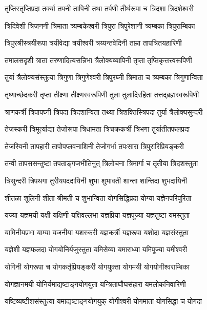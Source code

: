 \twolineshloka
{तृप्तिस्तृप्तिप्रदा तर्क्या तपनी तापिनी तथा}
{तर्पणी तीर्थरूपा च त्रिदशा त्रिदशेश्वरी}%

\twolineshloka
{त्रिदिवेशी त्रिजननी त्रिमाता त्र्यम्बकेश्वरी}
{त्रिपुरा त्रिपुरेशानी त्र्यम्बका त्रिपुराम्बिका}%

\twolineshloka
{त्रिपुरश्रीस्त्रयीरूपा त्रयीवेद्या त्रयीश्वरी}
{त्रय्यन्तवेदिनी ताम्रा तापत्रितयहारिणी}%

\twolineshloka
{तमालसदृशी त्राता तरुणादित्यसन्निभा}
{त्रैलोक्यव्यापिनी तृप्ता तृप्तिकृत्तत्त्वरूपिणी}%

\twolineshloka
{तुर्या त्रैलोक्यसंस्तुत्या त्रिगुणा त्रिगुणेश्वरी}
{त्रिपुरघ्नी त्रिमाता च त्र्यम्बका त्रिगुणान्विता}%

\twolineshloka
{तृष्णाच्छेदकरी तृप्ता तीक्ष्णा तीक्ष्णस्वरूपिणी}
{तुला तुलादिरहिता तत्तद्ब्रह्मस्वरूपिणी}%

\twolineshloka
{त्राणकर्त्री त्रिपापघ्नी त्रिपदा त्रिदशान्विता}
{तथ्या त्रिशक्तिस्त्रिपदा तुर्या त्रैलोक्यसुन्दरी}%

\twolineshloka
{तेजस्करी त्रिमूर्त्याद्या तेजोरूपा त्रिधामता}
{त्रिचक्रकर्त्री त्रिभगा तुर्यातीतफलप्रदा}%

\twolineshloka
{तेजस्विनी तापहारी तापोपप्लवनाशिनी}
{तेजोगर्भा तपःसारा त्रिपुरारिप्रियङ्करी}%

\twolineshloka
{तन्वी तापससन्तुष्टा तपताङ्गजभीतिनुत्}
{त्रिलोचना त्रिमार्गा च तृतीया त्रिदशस्तुता}%

\twolineshloka
{त्रिसुन्दरी त्रिपथगा तुरीयपददायिनी}
{शुभा शुभावती शान्ता शान्तिदा शुभदायिनी}%

\twolineshloka
{शीतळा शूलिनी शीता श्रीमती च शुभान्विता}
{योगसिद्धिप्रदा योग्या यज्ञेनपरिपूरिता}%

\twolineshloka
{यज्या यज्ञमयी यक्षी यक्षिणी यक्षिवल्लभा}
{यज्ञप्रिया यज्ञपूज्या यज्ञतुष्टा यमस्तुता}%

\twolineshloka
{यामिनीयप्रभा याम्या यजनीया यशस्करी}
{यज्ञकर्त्री यज्ञरूपा यशोदा यज्ञसंस्तुता}%

\twolineshloka
{यज्ञेशी यज्ञफलदा योगयोनिर्यजुस्तुता}
{यमिसेव्या यमाराध्या यमिपूज्या यमीश्वरी}%

\twolineshloka
{योगिनी योगरूपा च योगकर्तृप्रियङ्करी}
{योगयुक्ता योगमयी योगयोगीश्वराम्बिका}%

\twolineshloka
{योगज्ञानमयी योनिर्यमाद्यष्टाङ्गयोगयुता}
{यन्त्रिताघौघसंहारा यमलोकनिवारिणी}%

\twolineshloka
{यष्टिव्यष्टीशसंस्तुत्या यमाद्यष्टाङ्गयोगयुक्}
{योगीश्वरी योगमाता योगसिद्धा च योगदा}%

